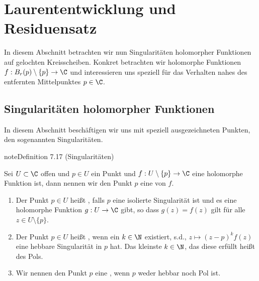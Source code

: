 \documentclass[letterpaper,10pt,german]{jupyterBook}
\begin{document}
\section{Laurententwicklung und Residuensatz}
\label{\detokenize{complexanalysis/residuensatz:laurententwicklung-und-residuensatz}}\label{\detokenize{complexanalysis/residuensatz::doc}}
\sphinxAtStartPar
In diesem Abschnitt betrachten wir nun Singularitäten holomorpher Funktionen auf gelochten Kreisscheiben. Konkret betrachten wir holomorphe Funktionen \(f:B_r(p)\setminus\{p\}\to\C\) und interessieren uns speziell für das Verhalten nahes des entfernten Mittelpunktes \(p\in\C\).


\subsection{Singularitäten holomorpher Funktionen}
\label{\detokenize{complexanalysis/residuensatz:singularitaten-holomorpher-funktionen}}
\sphinxAtStartPar
In diesem Abschnitt beschäftigen wir uns mit speziell ausgezeichneten Punkten, den sogenannten Singularitäten.
\label{complexanalysis/residuensatz:definition-0}
\begin{sphinxadmonition}{note}{Definition 7.17 (Singularitäten)}



\sphinxAtStartPar
Sei \(U \subset \C\) offen und \(p\in U\) ein Punkt und \(f: U \setminus \{p\}\to\C\) eine holomorphe Funktion ist, dann nennen wir den Punkt \(p\) eine  von \(f\).
\begin{enumerate}
%
\item {} 
\sphinxAtStartPar
Der Punkt \(p\in U\) heißt , falls \(p\) eine isolierte Singularität ist und es eine holomorphe Funktion \(g:U\to\C\) gibt, so dass \(g(z) = f(z)\) gilt für alle \(z \in U \setminus \{p\}\).

\item {} 
\sphinxAtStartPar
Der Punkt \(p\in U\) heißt , wenn ein \(k\in\N\) existiert, s.d., \(z\mapsto (z-p)^k f(z)\) eine hebbare Singularität in \(p\) hat. Das kleinste \(k\in\N\), das diese erfüllt heißt  des Pols.

\item {} 
\sphinxAtStartPar
Wir nennen den Punkt \(p\) eine , wenn \(p\) weder hebbar noch Pol ist.

\end{enumerate}
\end{sphinxadmonition}
\end{document}
